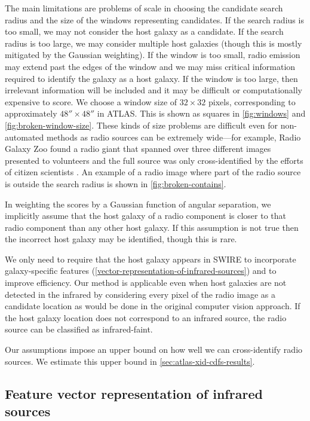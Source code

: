     {The main limitations are problems of scale in choosing the
    candidate search radius and the size of the windows
    representing candidates. If the search radius is too small, we may not
    consider the host galaxy as a candidate. If the search radius is too
    large, we may consider multiple host galaxies (though this is mostly
    mitigated by the Gaussian weighting). If the window is too small, radio
    emission may extend past the edges of the window and we may miss critical
    information required to identify the galaxy as a host galaxy. If the
    window is too large, then irrelevant information will be included and it
    may be difficult or computationally expensive to score. We choose a
    window size of $32 \times 32$ pixels, corresponding to approximately $48'' \times 48''$ in
    ATLAS. This is shown as squares in \autoref{fig:windows} and
    \autoref{fig:broken-window-size}. These kinds of size problems are
    difficult even for non-automated methods as radio sources can be extremely
    wide---for example, Radio Galaxy Zoo found a radio giant that spanned
    over three different images presented to volunteers and the full source
    was only cross-identified by the efforts of citizen scientists
    \citep{banfield15}. An example of a radio image where part of the radio
    source is outside the search radius is shown in
    \autoref{fig:broken-contains}.}

    In weighting the scores by a Gaussian function of angular
    separation, we implicitly assume that the host galaxy of a radio component
    is closer to that radio component than any other host galaxy. If this
    assumption is not true then the incorrect host galaxy may be identified, though
    this is rare.

    We only need to require that the host galaxy appears in SWIRE to
    incorporate galaxy-specific features
    (\autoref{vector-representation-of-infrared-sources}) and to improve
    efficiency. Our method is applicable even when host galaxies are not detected in
    the infrared by considering every pixel of the radio image as a candidate
    location as would be done in the original computer vision approach. {If the host galaxy location does not correspond to an infrared source, the radio source can be classified as infrared-faint.}

    Our assumptions impose an upper bound on how well we can cross-identify
    radio sources. We estimate this upper bound in \autoref{sec:atlas-xid-cdfs-results}.

  \subsection{Feature vector representation of infrared sources}
  \label{vector-representation-of-infrared-sources}

